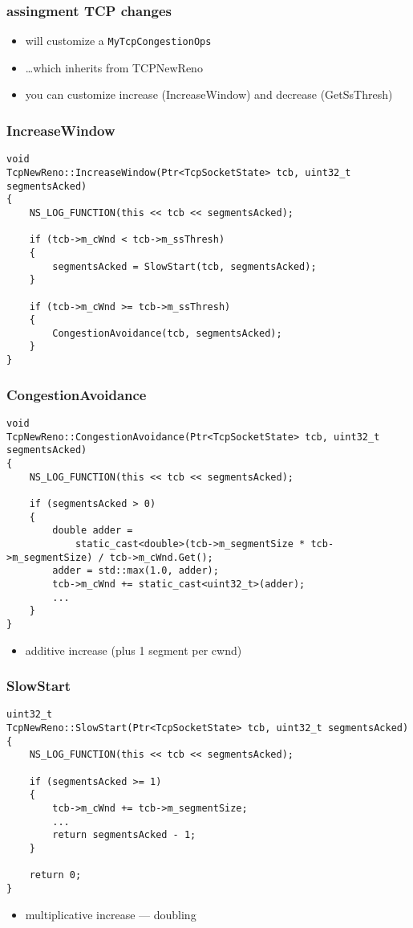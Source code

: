 \begin{frame}\frametitle{assingment TCP changes}
\begin{itemize}
\item will customize a \texttt{MyTcpCongestionOps}
\item \ldots which inherits from TCPNewReno
\vspace{.5cm}
\item you can customize increase (IncreaseWindow) and decrease (GetSsThresh)
\end{itemize}
\end{frame}

\begin{FragileFrame}
\frametitle{IncreaseWindow}
\begin{Verbatim}[fontsize=\fontsize{9}{10}]
void
TcpNewReno::IncreaseWindow(Ptr<TcpSocketState> tcb, uint32_t segmentsAcked)
{
    NS_LOG_FUNCTION(this << tcb << segmentsAcked);
 
    if (tcb->m_cWnd < tcb->m_ssThresh)
    {
        segmentsAcked = SlowStart(tcb, segmentsAcked);
    }
 
    if (tcb->m_cWnd >= tcb->m_ssThresh)
    {
        CongestionAvoidance(tcb, segmentsAcked);
    }
}
\end{Verbatim}
\end{FragileFrame}

\begin{FragileFrame}
\frametitle{CongestionAvoidance}
\begin{Verbatim}[fontsize=\fontsize{9}{10}]
void
TcpNewReno::CongestionAvoidance(Ptr<TcpSocketState> tcb, uint32_t segmentsAcked)
{
    NS_LOG_FUNCTION(this << tcb << segmentsAcked);
 
    if (segmentsAcked > 0)
    {
        double adder =
            static_cast<double>(tcb->m_segmentSize * tcb->m_segmentSize) / tcb->m_cWnd.Get();
        adder = std::max(1.0, adder);
        tcb->m_cWnd += static_cast<uint32_t>(adder);
        ...
    }
}
\end{Verbatim}
\begin{itemize}
\item additive increase (plus 1 segment per cwnd)
\end{itemize}
\end{FragileFrame}

\begin{FragileFrame}
\frametitle{SlowStart}
\begin{Verbatim}[fontsize=\fontsize{9}{10}]
uint32_t
TcpNewReno::SlowStart(Ptr<TcpSocketState> tcb, uint32_t segmentsAcked)
{
    NS_LOG_FUNCTION(this << tcb << segmentsAcked);
 
    if (segmentsAcked >= 1)
    {
        tcb->m_cWnd += tcb->m_segmentSize;
        ...
        return segmentsAcked - 1;
    }
 
    return 0;
}
\end{Verbatim}
\begin{itemize}
\item multiplicative increase --- doubling
\end{itemize}
\end{FragileFrame}

